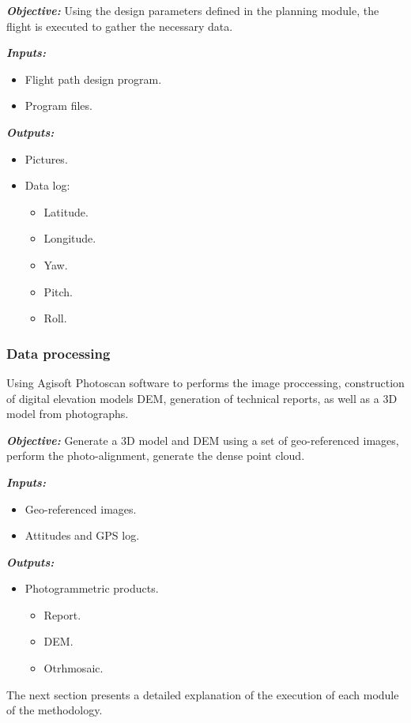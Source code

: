 \textit{\textbf{Objective:}} Using the design parameters defined in the planning module, the flight is executed to gather the necessary data.

\textit{\textbf{Inputs:}} 
\begin{itemize}
    \item Flight path design program.
    \item Program files.
\end{itemize}

\textit{\textbf{Outputs:}} 
\begin{itemize}
    \item Pictures.
    \item Data log:\begin{itemize}
        \item Latitude.
        \item Longitude.
        \item Yaw.
        \item Pitch.
        \item Roll.
    \end{itemize}
\end{itemize}

\subsubsection{Data processing}
Using  Agisoft Photoscan software to performs the image proccessing, construction of digital elevation models DEM, generation of technical reports, as well as a 3D model from photographs.

\textit{\textbf{Objective:}} Generate a 3D model and DEM using a set of geo-referenced images, perform the photo-alignment, generate the dense point cloud.

\textit{\textbf{Inputs:}} 
\begin{itemize}
    \item Geo-referenced images.
    \item Attitudes and GPS log.
\end{itemize}

\textit{\textbf{Outputs:}} 
\begin{itemize}
    \item Photogrammetric products.
    \begin{itemize}
        \item Report.
        \item DEM.
        \item Otrhmosaic.
    \end{itemize}
\end{itemize}
The next section presents a detailed explanation of the execution of each module of the methodology.
